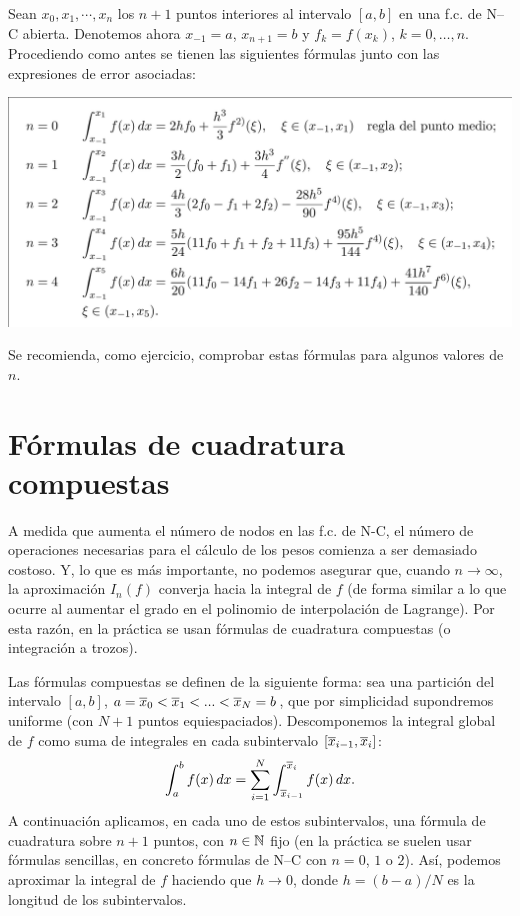 \begin{example}
  \label{ex:fc-NC-abiertas}
  Sean $x_0,x_1,\cdots,x_n$ los $n+1$ puntos interiores al intervalo
  $[a,b]$ en una f.c. de N--C abierta. Denotemos ahora $x_{-1}=a$,
  $x_{n+1}=b$ y $f_k=f(x_k)$, $k=0,\dots,n$. Procediendo como antes
  se tienen las siguientes fórmulas junto con las expresiones de error
  asociadas:
  \begin{center}
    \includegraphics[width=0.95\linewidth]{tema3/formulas-nc-abiertas}
  \end{center}
  Se recomienda, como ejercicio, comprobar estas fórmulas para algunos
  valores de $n$.
\end{example}

\section{Fórmulas de cuadratura compuestas}
\label{sec:fc-compuestas}

A medida que aumenta el número de nodos en las f.c. de N-C, el número
de operaciones necesarias para el cálculo de los pesos comienza a ser
demasiado costoso. Y, lo que es más importante, no podemos asegurar
que, cuando $n\to\infty$, la aproximación $I_n(f)$ converja hacia la
integral de $f$ (de forma similar a lo que ocurre al
aumentar el grado en el polinomio de interpolación de Lagrange). Por
esta razón, en la práctica se usan fórmulas de cuadratura
compuestas (o integración a trozos).

Las fórmulas compuestas se definen de la siguiente forma: sea una
partición del intervalo $[a,b]$, $a=\overline x_0<\overline x_1<...<\overline x_N=b$, que por
simplicidad supondremos uniforme (con $N+1$ puntos
equiespaciados).  Descomponemos
la integral global de $f$ como suma de integrales en cada subintervalo
$[\overline x_{i-1},\overline x_i]$:
\begin{equation*}
  \int_a^b f(x)\,dx = \sum_{i=1}^N \int_{\overline x_{i-1}}^{\overline x_i}f(x)\,dx.
\end{equation*}
A continuación aplicamos, en cada uno de estos subintervalos, una
fórmula de cuadratura sobre $n+1$ puntos, con $n\in\operatorname{{\mathbb N}}$ fijo (en la
práctica se suelen usar fórmulas sencillas, en concreto fórmulas de
N--C con $n=0$, $1$ o $2$). Así, podemos aproximar la integral de $f$
haciendo que $h\to 0$, donde $h=(b-a)/N$ es la longitud de
los subintervalos.

